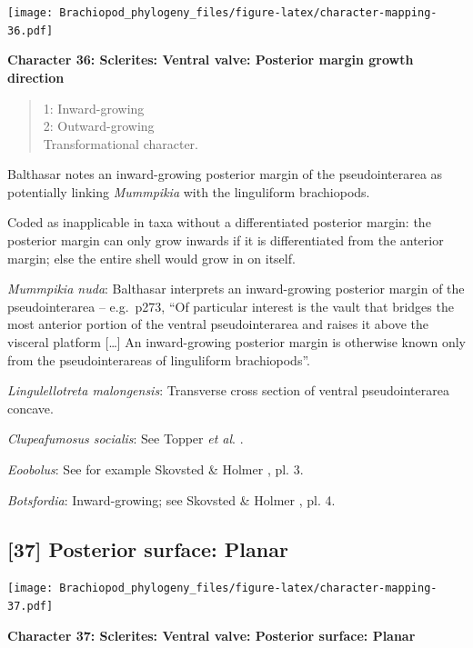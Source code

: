 \documentclass[openany]{book}
\theoremstyle{definition}
\theoremstyle{definition}
\theoremstyle{definition}
\theoremstyle{remark}
\begin{document}
\texttt{[image: Brachiopod\_phylogeny\_files/figure-latex/character-mapping-36.pdf]}

\textbf{Character 36: Sclerites: Ventral valve: Posterior margin growth
direction}

\begin{quote}
1: Inward-growing\\
2: Outward-growing\\
Transformational character.
\end{quote}

Balthasar \citeyearpar{Balthasar2008iMummpikia} notes an inward-growing
posterior margin of the pseudointerarea as potentially linking
\emph{Mummpikia} with the linguliform brachiopods.

Coded as inapplicable in taxa without a differentiated posterior margin:
the posterior margin can only grow inwards if it is differentiated from
the anterior margin; else the entire shell would grow in on itself.

\emph{Mummpikia nuda}: Balthasar \citeyearpar{Balthasar2008iMummpikia}
interprets an inward-growing posterior margin of the pseudointerarea --
e.g.~p273, ``Of particular interest is the vault that bridges the most
anterior portion of the ventral pseudointerarea and raises it above the
visceral platform {[}\ldots{}{]} An inward-growing posterior margin is
otherwise known only from the pseudointerareas of linguliform
brachiopods''.

\emph{Lingulellotreta malongensis}: Transverse cross section of ventral
pseudointerarea concave.

\emph{Clupeafumosus socialis}: See Topper \emph{et al}.
\citeyearpar{Topper2013Reappraisalof}.

\emph{Eoobolus}: See for example Skovsted \& Holmer
\citeyearpar{Skovsted2005EarlyCambrian}, pl. 3.

\emph{Botsfordia}: Inward-growing; see Skovsted \& Holmer
\citeyearpar{Skovsted2005EarlyCambrian}, pl. 4.

\hypertarget{posterior-surface-planar}{%
\subsection*{{[}37{]} Posterior surface:
Planar}\label{posterior-surface-planar}}

\texttt{[image: Brachiopod\_phylogeny\_files/figure-latex/character-mapping-37.pdf]}

\textbf{Character 37: Sclerites: Ventral valve: Posterior surface:
Planar}
\end{document}
